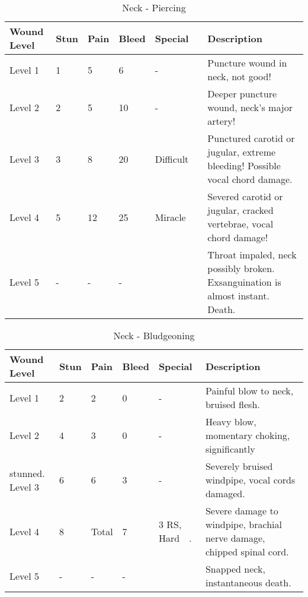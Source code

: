\documentclass[oneside,11pt,english]{book}
\begin{document}
\begin{table}[hb] %
	\caption{Neck - Piercing}
	\label{wound:Neck - Piercing}
	\begin{tabu} to 
Wound Level &Stun &Pain &Bleed &Special &Description\\\toprule
Level 1& 1& 5& 6& - &Puncture wound in neck, not good!\\
Level 2& 2& 5& 10& - &Deeper puncture wound, neck’s major artery!\\
Level 3& 3& 8& 20& Difficult~~ &Punctured carotid or jugular, extreme bleeding! Possible vocal chord damage.\\
Level 4& 5& 12& 25& Miracle~~ &Severed carotid or jugular, cracked vertebrae, vocal chord damage!\\
Level 5& - &- &- && Throat impaled, neck possibly broken. Exsanguination is almost instant. Death.\\
	\end{tabu}
\end{table}

\begin{table}[hb] %
	\caption{Neck - Bludgeoning}
	\label{wound:Neck - Bludgeoning}
	\begin{tabu} to 
Wound Level &Stun &Pain &Bleed &Special &Description\\\toprule
Level 1& 2& 2& 0& - &Painful blow to neck, bruised flesh. \\
Level 2& 4& 3& 0& - &Heavy blow, momentary choking, significantly \\
stunned. 
Level 3& 6& 6& 3& - &Severely bruised windpipe, vocal cords damaged. \\
Level 4 &8 &Total &7 
	& 3 RS, \newline
		Hard~~.
	&Severe damage to windpipe, brachial nerve damage, chipped spinal cord.\\
Level 5& - &- &- && Snapped neck, instantaneous death. \\
	\end{tabu}
\end{table}
\end{document}

